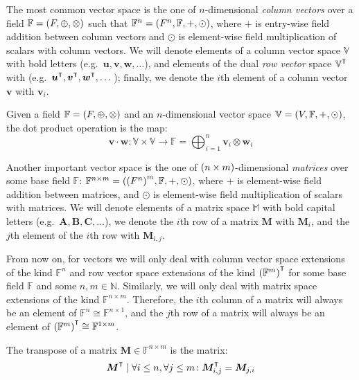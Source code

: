 The most common vector space is the one of \(n\)-dimensional \emph{column vectors} over a 
field \(\mathbb{F} = \Tuple{F, \oplus, \otimes}\) such that \(\mathbb{F}^n = 
\Tuple{F^n, \mathbb{F}, +, \odot}\), where \(+\) is entry-wise field addition between 
column vectors and \(\odot \) is element-wise field multiplication of scalars with column vectors.
We will denote elements of a column vector space \(\mathbb{V}\) with bold letters 
(e.g.\  \(\bm{u}, \bm{v}, \bm{w}, \dots \)), and elements of the dual \emph{row vector} space 
\(\mathbb{V}^{\transpose}\) with 
(e.g.\  \(\bm{u}^{\transpose}, \bm{v}^{\transpose}, \bm{w}^{\transpose}, \dots \)); 
finally, we denote the \(i\)th element of a column vector \(\bm{v}\) with \(\bm{v}_i\).
\begin{definition}
  Given a field \(\mathbb{F} = \Tuple{F, \oplus, \otimes}\) and an \(n\)-dimensional vector space 
  \(\mathbb{V} = \Tuple{V, \mathbb{F}, +, \odot}\), the dot product operation is the map:
  \[
    \bm{v} \cdot \bm{w}\colon \mathbb{V} \times \mathbb{V} \to \mathbb{F} = 
    \bigoplus_{i = 1}^{n}{\bm{v}_i \otimes \bm{w}_i}
  \]
\end{definition}

Another important vector space is the one of \(\Parens*{n \times m}\)-dimensional \emph{matrices} 
over some base field \(\mathbb{F}\): 
\(\mathbb{F}^{n \times m} = \Tuple{{\Parens*{F^n}}^m, \mathbb{F}, +, \odot}\), where \(+\) is 
element-wise field addition between matrices, and \(\odot \) is element-wise field multiplication 
of scalars with matrices.
We will denote elements of a matrix space \(\mathbb{M}\) with bold capital letters 
(e.g.\  \(\bm{A}, \bm{B}, \bm{C}, \dots \)), we denote the \(i\)th row of a matrix \(\bm{M}\) with 
\(\bm{M}_{i}\), 
and the \(j\)th element of the \(i\)th row with \(\bm{M}_{i,j}\).

From now on, for vectors we will only deal with column vector space extensions of the kind 
\(\mathbb{F}^n\) and row vector space extensions of the kind 
\(\Parens*{\mathbb{F}^m}^{\transpose}\) for some base field \(\mathbb{F}\) and some 
\(n, m \in \mathbb{N}\).
Similarly, we will only deal with matrix space extensions of the kind \(\mathbb{F}^{n \times m}\).
Therefore, the \(i\)th column of a matrix will always be an element of 
\(\mathbb{F}^{n} \cong \mathbb{F}^{n \times 1}\), and the \(j\)th row of a matrix will always be an
element of \(\Parens*{\mathbb{F}^m}^{\transpose} \cong \mathbb{F}^{1 \times m}\).

\begin{definition}
  The transpose of a matrix \(\bm{M} \in \mathbb{F}^{n \times m}\) is the matrix:
  \[\bm{M}^{\transpose} \mid 
  \forall i \le n, \forall j \le m\colon \bm{M}^{\transpose}_{i,j} = \bm{M}_{j,i}\]
\end{definition}

